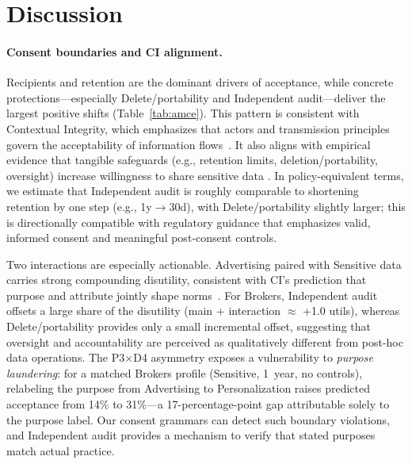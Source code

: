 \documentclass{eusset}
\begin{document}
\section{Discussion}
\label{sec:discussion}

\paragraph{Consent boundaries and CI alignment.}
Recipients and retention are the dominant drivers of acceptance, while concrete protections---especially Delete/portability and Independent audit---deliver the largest positive shifts (Table~\ref{tab:amce}). This pattern is consistent with Contextual Integrity, which emphasizes that actors and transmission principles govern the acceptability of information flows~\citep{Nissenbaum2004ContextualIntegrity,MartinNissenbaum2016MeasuringPrivacy}. It also aligns with empirical evidence that tangible safeguards (e.g., retention limits, deletion/portability, oversight) increase willingness to share sensitive data \citep{Gupta2023ConsumerViewsJAMA}. In policy-equivalent terms, we estimate that Independent audit is roughly comparable to shortening retention by one step (e.g., 1y$\to$30d), with Delete/portability slightly larger; this is directionally compatible with regulatory guidance that emphasizes valid, informed consent and meaningful post‑consent controls.

Two interactions are especially actionable. Advertising paired with Sensitive data carries strong compounding disutility, consistent with CI's prediction that purpose and attribute jointly shape norms~\citep{Nissenbaum2004ContextualIntegrity,MartinNissenbaum2016MeasuringPrivacy}. For Brokers, Independent audit offsets a large share of the disutility (main $+$ interaction $\approx$ +1.0 utils), whereas Delete/portability provides only a small incremental offset, suggesting that oversight and accountability are perceived as qualitatively different from post-hoc data operations. The P3$\times$D4 asymmetry exposes a vulnerability to \emph{purpose laundering}: for a matched Brokers profile (Sensitive, 1~year, no controls), relabeling the purpose from Advertising to Personalization raises predicted acceptance from 14\% to 31\%---a 17-percentage-point gap attributable solely to the purpose label. Our consent grammars can detect such boundary violations, and Independent audit provides a mechanism to verify that stated purposes match actual practice.
\end{document}
